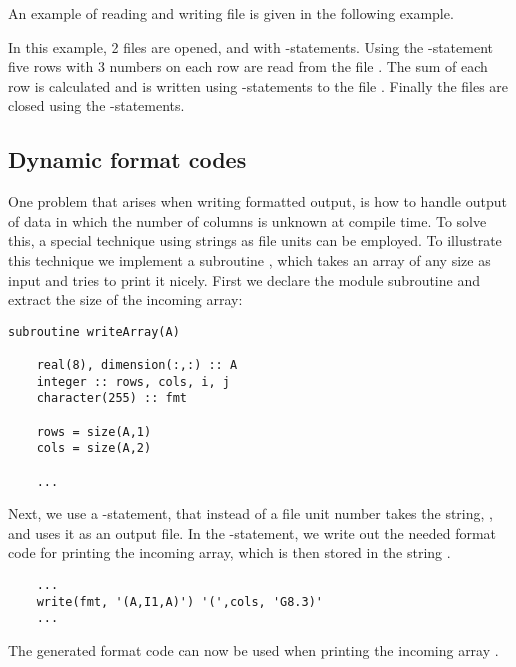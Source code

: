 An example of reading and writing file is given in the following example.



In this example, 2 files are opened,  and  with -statements. Using the -statement five rows with 3 numbers on each row are read from the file . The sum of each row is calculated and is written using -statements to the file . Finally the files are closed using the -statements.

\subsection{Dynamic format codes}

One problem that arises when writing formatted output, is how to handle output of data in which the number of columns is unknown at compile time. To solve this, a special technique using strings as file units can be employed. To illustrate this technique we implement a subroutine , which takes an array of any size as input and tries to print it nicely. First we declare the module subroutine and extract the size of the incoming array:

\begin{lstlisting}
subroutine writeArray(A)
		
	real(8), dimension(:,:) :: A
	integer :: rows, cols, i, j
	character(255) :: fmt
		
	rows = size(A,1)
	cols = size(A,2)

	...
\end{lstlisting}

Next, we use a -statement, that instead of a file unit number takes the string, , and uses it as an output file. In the -statement, we write out the needed format code for printing the incoming array, which is then stored in the string .

\begin{lstlisting}
	...
	write(fmt, '(A,I1,A)') '(',cols, 'G8.3)'  
	...
\end{lstlisting}

The generated format code can now be used when printing the incoming array .

